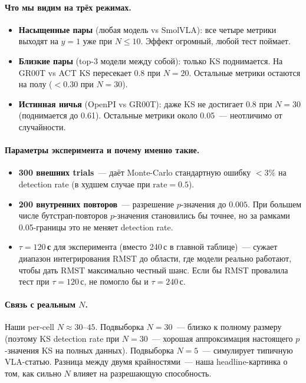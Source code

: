 \documentclass[11pt]{article}
\begin{document}
\paragraph{Что мы видим на трёх режимах.}
\begin{itemize}[leftmargin=2em, itemsep=1pt]
\item \textbf{Насыщенные пары} (любая модель vs SmolVLA): все четыре метрики выходят на $y=1$ уже при $N \le 10$. Эффект огромный, любой тест поймает.
\item \textbf{Близкие пары} (top-3 модели между собой): только KS поднимается. На GR00T vs ACT KS пересекает 0.8 при $N=20$. Остальные метрики остаются на полу ($<0.30$ при $N=30$).
\item \textbf{Истинная ничья} (OpenPI vs GR00T): даже KS не достигает 0.8 при $N=30$ (поднимается до 0.61). Остальные метрики около 0.05~--- неотличимо от случайности.
\end{itemize}

\paragraph{Параметры эксперимента и почему именно такие.}
\begin{itemize}[leftmargin=2em, itemsep=1pt]
\item \textbf{300 внешних trials}~--- даёт Monte-Carlo стандартную ошибку $<3\%$ на detection rate (в худшем случае при $\text{rate}=0.5$).
\item \textbf{200 внутренних повторов}~--- разрешение $p$-значения до $0.005$. При большем числе бутстрап-повторов $p$-значения становились бы точнее, но за рамками 0.05-границы это не меняет detection rate.
\item \textbf{$\tau = 120$\,с} для эксперимента (вместо 240\,с в главной таблице)~--- сужает диапазон интегрирования RMST до области, где модели реально работают, чтобы дать RMST максимально честный шанс. Если бы RMST провалила тест при $\tau=120$\,с, не помогло бы и $\tau=240$\,с.
\end{itemize}

\paragraph{Связь с реальным $N$.} Наши per-cell $N \approx 30$--$45$. Подвыборка $N=30$~--- близко к полному размеру (поэтому KS detection rate при $N=30$~--- хорошая аппроксимация настоящего $p$-значения KS на полных данных). Подвыборка $N=5$~--- симулирует типичную VLA-статью. Разница между двумя крайностями~--- наша headline-картинка о том, как сильно $N$ влияет на разрешающую способность.
\end{document}
